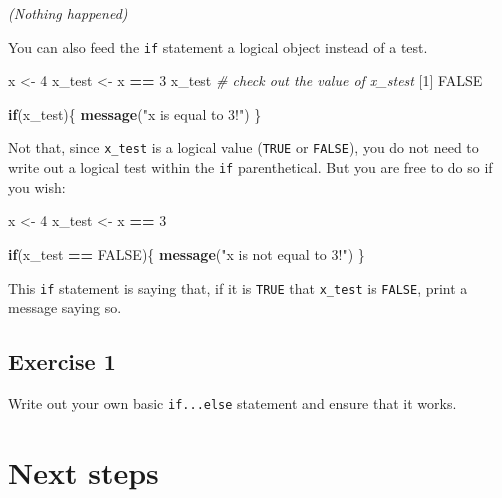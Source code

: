 \documentclass[]{book}
\newenvironment{Shaded}{\begin{snugshade}}{\end{snugshade}}
\newcommand{\CommentTok}[1]{\textcolor[rgb]{0.56,0.35,0.01}{\textit{#1}}}
\newcommand{\ControlFlowTok}[1]{\textcolor[rgb]{0.13,0.29,0.53}{\textbf{#1}}}
\newcommand{\DecValTok}[1]{\textcolor[rgb]{0.00,0.00,0.81}{#1}}
\newcommand{\KeywordTok}[1]{\textcolor[rgb]{0.13,0.29,0.53}{\textbf{#1}}}
\newcommand{\NormalTok}[1]{#1}
\newcommand{\OperatorTok}[1]{\textcolor[rgb]{0.81,0.36,0.00}{\textbf{#1}}}
\newcommand{\OtherTok}[1]{\textcolor[rgb]{0.56,0.35,0.01}{#1}}
\newcommand{\StringTok}[1]{\textcolor[rgb]{0.31,0.60,0.02}{#1}}
\begin{document}
\emph{(Nothing happened)}

You can also feed the \texttt{if} statement a logical object instead of a test.

\begin{Shaded}
\begin{Highlighting}[]
\NormalTok{x <-}\StringTok{ }\DecValTok{4}
\NormalTok{x_test <-}\StringTok{ }\NormalTok{x }\OperatorTok{==}\StringTok{ }\DecValTok{3}
\NormalTok{x_test }\CommentTok{# check out the value of x_stest}
\NormalTok{[}\DecValTok{1}\NormalTok{] }\OtherTok{FALSE}

\ControlFlowTok{if}\NormalTok{(x_test)\{}
  \KeywordTok{message}\NormalTok{(}\StringTok{"x is equal to 3!"}\NormalTok{)}
\NormalTok{\}}
\end{Highlighting}
\end{Shaded}

Not that, since \texttt{x\_test} is a logical value (\texttt{TRUE} or \texttt{FALSE}), you do not need to write out a logical test within the \texttt{if} parenthetical. But you are free to do so if you wish:

\begin{Shaded}
\begin{Highlighting}[]
\NormalTok{x <-}\StringTok{ }\DecValTok{4}
\NormalTok{x_test <-}\StringTok{ }\NormalTok{x }\OperatorTok{==}\StringTok{ }\DecValTok{3}

\ControlFlowTok{if}\NormalTok{(x_test }\OperatorTok{==}\StringTok{ }\OtherTok{FALSE}\NormalTok{)\{}
  \KeywordTok{message}\NormalTok{(}\StringTok{"x is not equal to 3!"}\NormalTok{)}
\NormalTok{\}}
\end{Highlighting}
\end{Shaded}

This \texttt{if} statement is saying that, if it is \texttt{TRUE} that \texttt{x\_test} is \texttt{FALSE}, print a message saying so.

\hypertarget{exercise-1-1}{%
\subsection*{Exercise 1}\label{exercise-1-1}}

Write out your own basic \texttt{if...else} statement and ensure that it works.

\hypertarget{next-steps-1}{%
\section*{Next steps}\label{next-steps-1}}
\end{document}
